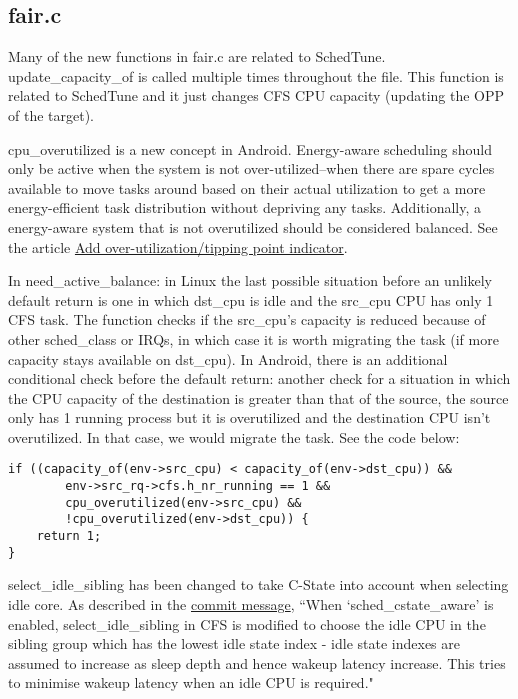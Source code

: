 \documentclass{article}
\begin{document}
\subsection{fair.c}

Many of the new functions in fair.c are related to SchedTune. update\_capacity\_of is called multiple times throughout the file. This function is related to SchedTune and it just changes CFS CPU capacity (updating the OPP of the target).

\par

cpu\_overutilized is a new concept in Android. Energy-aware scheduling should only be active when the system is not over-utilized--when there are spare cycles available to move tasks around based on their actual utilization to get a more energy-efficient task distribution without depriving any tasks. Additionally, a energy-aware system that is not overutilized should be considered balanced. See the article \href{https://patchwork.kernel.org/patch/6738381/}{Add over-utilization/tipping point indicator}.

\par
In need\_active\_balance: in Linux the last possible situation before an unlikely default return is one in which dst\_cpu is idle and the src\_cpu CPU has only 1 CFS task. The function checks if the src\_cpu's capacity is reduced because of other sched\_class or IRQs, in which case it is worth migrating the task (if more capacity stays available on dst\_cpu). In Android, there is an additional conditional check before the default return: another check for a situation in which the CPU capacity of the destination is greater than that of the source, the source only has 1 running process but it is overutilized and the destination CPU isn't overutilized. In that case, we would migrate the task. See the code below:

\begin{verbatim}
if ((capacity_of(env->src_cpu) < capacity_of(env->dst_cpu)) && 
        env->src_rq->cfs.h_nr_running == 1 && 
        cpu_overutilized(env->src_cpu) && 
        !cpu_overutilized(env->dst_cpu)) { 
    return 1; 
}
\end{verbatim}

\par
select\_idle\_sibling has been changed to take C-State into account when selecting idle core. As described in the \href{https://groups.google.com/a/chromium.org/forum/#!topic/chromium-os-reviews/4-OgGzENZKw][ANDROID}{commit message}, ``When `sched\_cstate\_aware' is enabled, select\_idle\_sibling in CFS is modified to choose the idle CPU in the sibling group which has the lowest idle state index - idle state indexes are assumed to increase as sleep depth and hence wakeup latency increase. This tries to minimise wakeup latency when an idle CPU is required."
\end{document}
